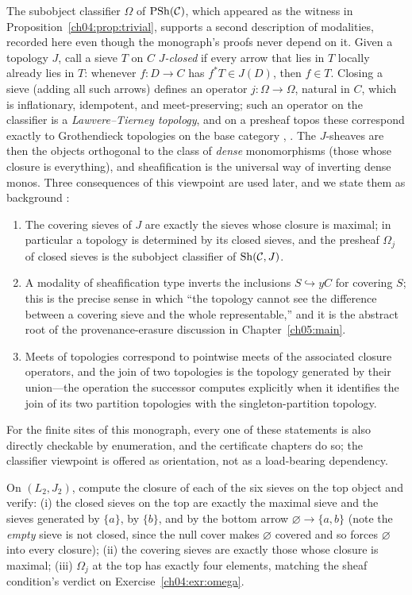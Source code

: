 The subobject classifier $\Omega$ of $\mathrm{PSh}(\mathcal{C})$, which appeared as the
witness in Proposition~\ref{ch04:prop:trivial}, supports a second description
of modalities, recorded here even though the monograph's proofs never
depend on it. Given a topology $J$, call a sieve $T$ on $C$
\emph{$J$-closed} if every arrow that lies in $T$ locally already lies in
$T$: whenever $f:D\to C$ has $f^{*}T\in J(D)$, then $f\in T$. Closing a sieve
(adding all such arrows) defines an operator $j:\Omega\to\Omega$, natural in
$C$, which is inflationary, idempotent, and meet-preserving; such an operator
on the classifier is a \emph{Lawvere--Tierney topology}, and on a presheaf
topos these correspond exactly to Grothendieck topologies on the base
category \cite[Chap.~V]{maclane}, \cite{johnstone}. The $J$-sheaves are then
the objects orthogonal to the class of \emph{dense} monomorphisms (those
whose closure is everything), and sheafification is the universal way of
inverting dense monos. Three consequences of this viewpoint are used later,
and we state them as background \cite{maclane,johnstone}:
\begin{enumerate}
\item The covering sieves of $J$ are exactly the sieves whose closure is
maximal; in particular a topology is determined by its closed sieves, and the
presheaf $\Omega_j$ of closed sieves is the subobject classifier of
$\mathrm{Sh}(\mathcal{C},J)$.
\item A modality of sheafification type inverts the inclusions
$S\hookrightarrow yC$ for covering $S$; this is the precise sense in which
``the topology cannot see the difference between a covering sieve and the
whole representable,'' and it is the abstract root of the provenance-erasure
discussion in Chapter~\ref{ch05:main}.
\item Meets of topologies correspond to pointwise meets of the associated
closure operators, and the join of two topologies is the topology generated
by their union---the operation the successor computes explicitly when it
identifies the join of its two partition topologies with the
singleton-partition topology.
\end{enumerate}
For the finite sites of this monograph, every one of these statements is also
directly checkable by enumeration, and the certificate chapters do so; the
classifier viewpoint is offered as orientation, not as a load-bearing
dependency.

\begin{exercise}\label{ch04:exr:closed}
On $(L_2,J_2)$, compute the closure of each of the six sieves on the top
object and verify: (i) the closed sieves on the top are exactly the maximal
sieve and the sieves generated by $\{a\}$, by $\{b\}$, and by the bottom
arrow $\varnothing\to\{a,b\}$ (note the \emph{empty} sieve is not closed,
since the null cover makes $\varnothing$ covered and so forces $\varnothing$
into every closure);
(ii) the covering sieves are exactly those whose closure is maximal;
(iii) $\Omega_j$ at the top has exactly four elements, matching the sheaf
condition's verdict on Exercise~\ref{ch04:exr:omega}.
\end{exercise}

